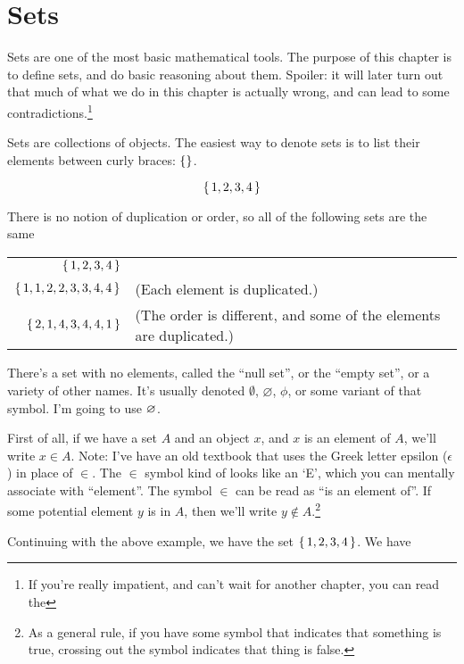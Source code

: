 \chapter{Sets}

Sets are one of the most basic mathematical tools. The purpose of this
chapter is to define sets, and do basic reasoning about them. Spoiler:
it will later turn out that much of what we do in this chapter is
actually wrong, and can lead to some contradictions.\footnote{If
  you're really impatient, and can't wait for another chapter, you can
  read the }

Sets are collections of objects. The easiest way to denote sets is to
list their elements between curly braces: $\left\{  \right\}$.

\begin{displaymath}
  \left\{ \, 1,2,3,4 \, \right\}
\end{displaymath}

There is no notion of duplication or order, so all of the following
sets are the same

\begin{tabu}to 
  $\left\{ \, 1,2,3,4 \, \right\}$         & \\
  $\left\{ \, 1,1,2,2,3,3,4,4 \, \right\}$ & (Each element is duplicated.) \\
  $\left\{ \, 2,1,4,3,4,4,1 \, \right\}$   & (The order is different, and some of the elements are duplicated.)
\end{tabu}

There's a set with no elements, called the ``null set'', or the
``empty set'', or a variety of other names. It's usually denoted
$\emptyset$, $\varnothing$, $\phi$, or some variant of that
symbol. I'm going to use $\varnothing$.

First of all, if we have a set $A$ and an object $x$, and $x$ is an
element of $A$, we'll write $x \in A$. Note: I've have an old textbook
that uses the Greek letter epsilon ($\epsilon$) in place of $\in$. The
$\in$ symbol kind of looks like an `E', which you can mentally
associate with ``element''. The symbol $\in$ can be read as ``is an
element of''. If some potential element $y$ is  in $A$, then
we'll write $y \notin A$.\footnote{As a general rule, if you have some
  symbol that indicates that something is true, crossing out the
  symbol indicates that thing is false.}

Continuing with the above example, we have the set
$\left\{ \, 1,2,3,4 \, \right\}$. We have

